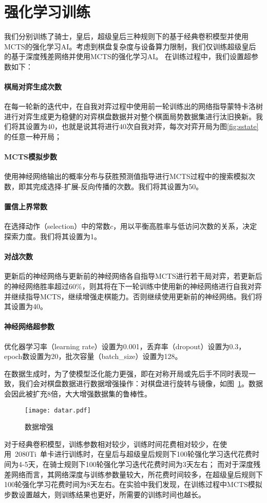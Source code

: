 \section{强化学习训练}
我们分别训练了骑士，皇后，超级皇后三种规则下的基于经典卷积模型并使用MCTS的强化学习AI。考虑到棋盘复杂度与设备算力限制，我们仅训练超级皇后的基于深度残差网络并使用MCTS的强化学习AI。
在训练过程中，我们设置超参数如下：
\paragraph{棋局对弈生成次数}
在每一轮新的迭代中，在自我对弈过程中使用前一轮训练出的网络指导蒙特卡洛树进行对弈生成更为稳健的对弈棋盘数据并对整个棋面局势数据集进行汰旧换新。我们将其设置为40，也就是说其将进行40次自我对弈，每次对弈开局为图\ref{fig:sstate}的任意一种开局；
\paragraph{MCTS模拟步数}
使用神经网络输出的概率分布与获胜预测值指导进行MCTS过程中的搜索模拟次数，即其完成选择-扩展-反向传播的次数。我们将其设置为50。
\paragraph{置信上界常数}
在选择动作（selection）中的常数$c$，用以平衡高胜率与低访问次数的关系，决定探索力度。我们将其设置为1。
\paragraph{对战次数}
更新后的神经网络与更新前的神经网络各自指导MCTS进行若干局对弈，若更新后的神经网络胜率超过$60\%$，则其将在下一轮训练中使用新的神经网络进行自我对弈并继续指导MCTS，继续增强走棋能力。否则继续使用更新前的神经网络。我们将其设置为40。
\paragraph{神经网络超参数}
优化器学习率（learning rate）设置为0.001，丢弃率（dropout）设置为0.3，epoch数设置为20，批次容量（batch\_size）设置为128。


在数据生成时，为了使模型泛化能力更强，即在对称开局或先后手不同时表现一致，我们会对棋盘数据进行数据增强操作：对棋盘进行旋转与镜像，如图~\ref{fig:datar}。数据会因此被扩充8倍，大大增强数据集的鲁棒性。
\begin{figure}[H]
    \centering
    \texttt{[image: datar.pdf]}
    \caption[datar]{%
        数据增强%
      }
    \label{fig:datar}
\end{figure}
对于经典卷积模型，训练参数相对较少，训练时间花费相对较少，在使用~2080Ti~单卡进行训练时，在皇后与超级皇后规则下100轮强化学习迭代花费时间为4-5天，在骑士规则下100轮强化学习迭代花费时间为3天左右；
而对于深度残差网络而言，其网络深度与训练参数量较大，所花费时间较多，在超级皇后规则下100轮强化学习花费时间为8天左右。在实验中我们发现，在训练过程中MCTS模拟步数设置越大，则训练结果也更好，所需要的训练时间也越长。

